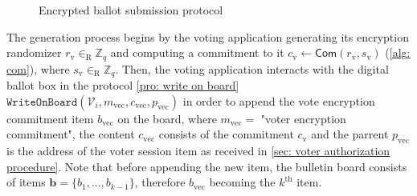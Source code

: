 \begin{figure}[ht]
    \caption{Encrypted ballot submission protocol}
    \label{fig: encrypted ballot submission protocol}
\end{figure}

The generation process begins by the voting application generating its encryption randomizer $r_\mathrm{v} \in_\mathrm{R} \mathbb{Z}_q$ and computing a commitment to it $c_\mathrm{v} \gets \mathsf{Com}(r_\mathrm{v}, s_\mathrm{v})$ (\cref{alg: com}), where $s_\mathrm{v} \in_\mathrm{R} \mathbb{Z}_q$. Then, the voting application interacts with the digital ballot box in the protocol \ref{pro: write on board} $\mathtt{WriteOnBoard}(\mathcal{V}_i, m_\mathrm{vec}, c_\mathrm{vec}, p_\mathrm{vec})$ in order to append the vote encryption commitment item $b_\mathrm{vec}$ on the board, where $m_\mathrm{vec} =$ "voter encryption commitment", the content $c_\mathrm{vec}$ consists of the commitment $c_\mathrm{v}$ and the parrent $p_\mathrm{vec}$ is the address of the voter session item as received in \cref{sec: voter authorization procedure}. Note that before appending the new item, the bulletin board consists of items $\boldsymbol{b} = \{ b_1, ..., b_{k-1} \}$, therefore $b_\mathrm{vec}$ becoming the $k^\mathrm{th}$ item.

